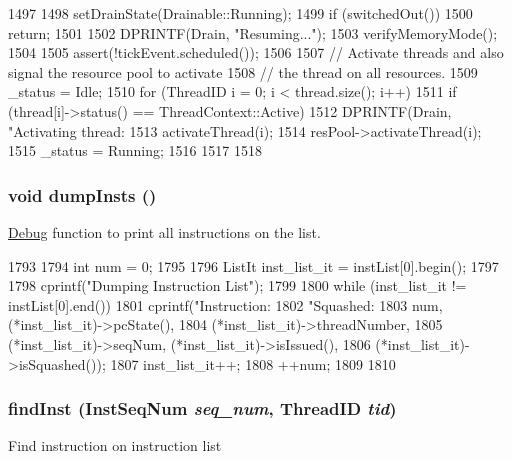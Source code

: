 \begin{DoxyCode}
1497 {
1498     setDrainState(Drainable::Running);
1499     if (switchedOut())
1500         return;
1501 
1502     DPRINTF(Drain, "Resuming...\n");
1503     verifyMemoryMode();
1504 
1505     assert(!tickEvent.scheduled());
1506 
1507     // Activate threads and also signal the resource pool to activate
1508     // the thread on all resources.
1509     _status = Idle;
1510     for (ThreadID i = 0; i < thread.size(); i++) {
1511         if (thread[i]->status() == ThreadContext::Active) {
1512             DPRINTF(Drain, "Activating thread: %
1513             activateThread(i);
1514             resPool->activateThread(i);
1515             _status = Running;
1516         }
1517     }
1518 }
\end{DoxyCode}
\hypertarget{classInOrderCPU_a80587b4fe043bbe1995536cb3b361588}{
\subsubsection[{dumpInsts}]{\setlength{\rightskip}{0pt plus 5cm}void dumpInsts ()}}
\label{classInOrderCPU_a80587b4fe043bbe1995536cb3b361588}
\hyperlink{namespaceDebug}{Debug} function to print all instructions on the list. 


\begin{DoxyCode}
1793 {
1794     int num = 0;
1795 
1796     ListIt inst_list_it = instList[0].begin();
1797 
1798     cprintf("Dumping Instruction List\n");
1799 
1800     while (inst_list_it != instList[0].end()) {
1801         cprintf("Instruction:%
1802                 "Squashed:%
1803                 num, (*inst_list_it)->pcState(),
1804                 (*inst_list_it)->threadNumber,
1805                 (*inst_list_it)->seqNum, (*inst_list_it)->isIssued(),
1806                 (*inst_list_it)->isSquashed());
1807         inst_list_it++;
1808         ++num;
1809     }
1810 }
\end{DoxyCode}
\hypertarget{classInOrderCPU_ac5d1854609f029a63ef2374408a1e499}{
\subsubsection[{findInst}]{ findInst ({\bf InstSeqNum} {\em seq\_\-num}, \/  {\bf ThreadID} {\em tid})}}
\label{classInOrderCPU_ac5d1854609f029a63ef2374408a1e499}
Find instruction on instruction list 


